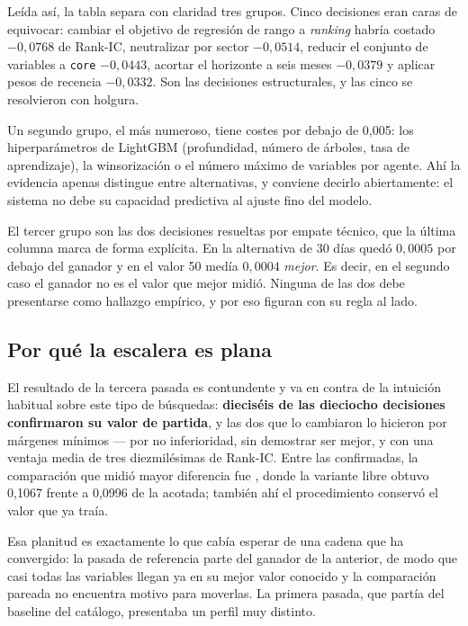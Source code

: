 Leída así, la tabla separa con claridad tres grupos. Cinco decisiones eran caras de equivocar:
cambiar el objetivo de regresión de rango a \textit{ranking} habría costado $-0{,}0768$ de Rank-IC,
neutralizar por sector $-0{,}0514$, reducir el conjunto de variables a \texttt{core} $-0{,}0443$,
acortar el horizonte a seis meses $-0{,}0379$ y aplicar pesos de recencia $-0{,}0332$. Son las
decisiones estructurales, y las cinco se resolvieron con holgura.

Un segundo grupo, el más numeroso, tiene costes por debajo de 0,005: los hiperparámetros de LightGBM
(profundidad, número de árboles, tasa de aprendizaje), la winsorización o el número máximo de
variables por agente. Ahí la evidencia apenas distingue entre alternativas, y conviene decirlo
abiertamente: el sistema no debe su capacidad predictiva al ajuste fino del modelo.

El tercer grupo son las dos decisiones resueltas por empate técnico, que la última columna marca de
forma explícita. En  la alternativa de 30 días quedó $0{,}0005$ por
debajo del ganador y en  el valor 50 medía $0{,}0004$
\emph{mejor}. Es decir, en el segundo caso el ganador no es el valor que mejor midió. Ninguna de las
dos debe presentarse como hallazgo empírico, y por eso figuran con su regla al lado.

\subsection*{Por qué la escalera es plana}

El resultado de la tercera pasada es contundente y va en contra de la intuición habitual sobre este
tipo de búsquedas: \textbf{dieciséis de las dieciocho decisiones confirmaron su valor de partida}, y
las dos que lo cambiaron lo hicieron por márgenes mínimos --- 
por no inferioridad, sin demostrar ser mejor, y  con una ventaja
media de tres diezmilésimas de Rank-IC. Entre las confirmadas, la comparación que midió mayor
diferencia fue , donde la variante libre obtuvo 0,1067 frente a 0,0996 de la
acotada; también ahí el procedimiento conservó el valor que ya traía.

Esa planitud es exactamente lo que cabía esperar de una cadena que ha convergido: la pasada de
referencia parte del ganador de la anterior, de modo que casi todas las variables llegan ya en su
mejor valor conocido y la comparación pareada no encuentra motivo para moverlas. La primera pasada,
que partía del baseline del catálogo, presentaba un perfil muy distinto.

